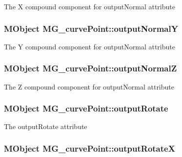 The X compound component for output\-Normal attribute \hypertarget{class_m_g__curve_point_a75140198bea8fe10ce577d57c0067e85}{
\subsubsection[{output\-Normal\-Y}]{\setlength{\rightskip}{0pt plus 5cm}M\-Object M\-G\-\_\-curve\-Point\-::output\-Normal\-Y\hspace{0.3cm}{\ttfamily [static]}}}\label{class_m_g__curve_point_a75140198bea8fe10ce577d57c0067e85}
The Y compound component for output\-Normal attribute \hypertarget{class_m_g__curve_point_ac0f7c2a5502c30630edd5ab570271704}{
\subsubsection[{output\-Normal\-Z}]{\setlength{\rightskip}{0pt plus 5cm}M\-Object M\-G\-\_\-curve\-Point\-::output\-Normal\-Z\hspace{0.3cm}{\ttfamily [static]}}}\label{class_m_g__curve_point_ac0f7c2a5502c30630edd5ab570271704}
The Z compound component for output\-Normal attribute \hypertarget{class_m_g__curve_point_ad286406025b43364a2999b10d40a66ba}{
\subsubsection[{output\-Rotate}]{\setlength{\rightskip}{0pt plus 5cm}M\-Object M\-G\-\_\-curve\-Point\-::output\-Rotate\hspace{0.3cm}{\ttfamily [static]}}}\label{class_m_g__curve_point_ad286406025b43364a2999b10d40a66ba}
The output\-Rotate attribute \hypertarget{class_m_g__curve_point_a0a64f7e3cdcbb2ab38b22db884eb24f3}{
\subsubsection[{output\-Rotate\-X}]{\setlength{\rightskip}{0pt plus 5cm}M\-Object M\-G\-\_\-curve\-Point\-::output\-Rotate\-X\hspace{0.3cm}{\ttfamily [static]}}}\label{class_m_g__curve_point_a0a64f7e3cdcbb2ab38b22db884eb24f3}

